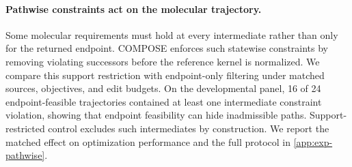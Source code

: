 \paragraph{Pathwise constraints act on the molecular trajectory.}
Some molecular requirements must hold at every intermediate rather than only for
the returned endpoint. COMPOSE enforces such statewise constraints by removing
violating successors before the reference kernel is normalized. We compare this
support restriction with endpoint-only filtering under matched sources,
objectives, and edit budgets.
On the developmental panel, 16 of 24 endpoint-feasible trajectories contained at
least one intermediate constraint violation, showing that endpoint feasibility
can hide inadmissible paths. Support-restricted control excludes such
intermediates by construction. We report the matched effect on optimization
performance and the full protocol in \cref{app:exp-pathwise}.


